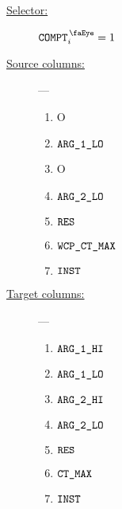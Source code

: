 \begin{description}
	\item[\underline{Selector:}] $\isRlpUtilsCompt_{i} = 1$
	\item[\underline{Source columns:}] ---
		\begin{multicols}{4}
			\begin{enumerate}
				\item O
				\item $\texttt{ARG}\texttt{\_1}\texttt{\_LO}$
				\item O
				\item $\texttt{ARG}\texttt{\_2}\texttt{\_LO}$
				\item $\texttt{RES}$
				\item $\texttt{WCP\_CT\_MAX}$
				\item $\texttt{INST}$
			\end{enumerate}
		\end{multicols}
	\item[\underline{Target columns:}] ---
		\begin{multicols}{4}
		\begin{enumerate}
			\item $\texttt{ARG}\texttt{\_1}\texttt{\_HI}$
			\item $\texttt{ARG}\texttt{\_1}\texttt{\_LO}$
			\item $\texttt{ARG}\texttt{\_2}\texttt{\_HI}$
			\item $\texttt{ARG}\texttt{\_2}\texttt{\_LO}$
			\item $\texttt{RES}$
			\item $\texttt{CT\_MAX}$
			\item $\texttt{INST}$
		\end{enumerate}
		\end{multicols}
\end{description}